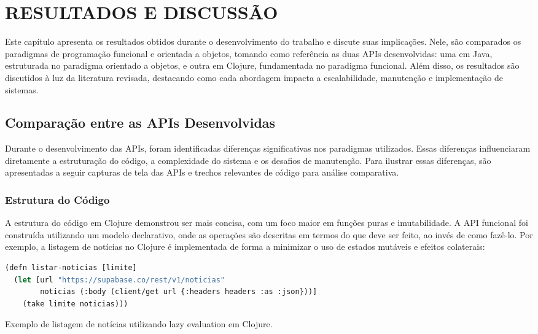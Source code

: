\chapter{RESULTADOS E DISCUSSÃO}

Este capítulo apresenta os resultados obtidos durante o desenvolvimento do trabalho e discute suas implicações. Nele, são comparados os paradigmas de programação funcional e orientada a objetos, tomando como referência as duas APIs desenvolvidas: uma em Java, estruturada no paradigma orientado a objetos, e outra em Clojure, fundamentada no paradigma funcional. Além disso, os resultados são discutidos à luz da literatura revisada, destacando como cada abordagem impacta a escalabilidade, manutenção e implementação de sistemas.

\section{Comparação entre as APIs Desenvolvidas}

Durante o desenvolvimento das APIs, foram identificadas diferenças significativas nos paradigmas utilizados. Essas diferenças influenciaram diretamente a estruturação do código, a complexidade do sistema e os desafios de manutenção. Para ilustrar essas diferenças, são apresentadas a seguir capturas de tela das APIs e trechos relevantes de código para análise comparativa.

\subsection{Estrutura do Código}

A estrutura do código em Clojure demonstrou ser mais concisa, com um foco maior em funções puras e imutabilidade. A API funcional foi construída utilizando um modelo declarativo, onde as operações são descritas em termos do que deve ser feito, ao invés de como fazê-lo. Por exemplo, a listagem de notícias no Clojure é implementada de forma a minimizar o uso de estados mutáveis e efeitos colaterais:

\begin{tcolorbox}[colback=gray!5!white, colframe=gray!75!black, title={Trecho de Código - Listagem de Notícias em Clojure}]
\begin{lstlisting}[language=Lisp]
(defn listar-noticias [limite]
  (let [url "https://supabase.co/rest/v1/noticias"
        noticias (:body (client/get url {:headers headers :as :json}))]
    (take limite noticias)))
\end{lstlisting}
\caption{Exemplo de listagem de notícias utilizando lazy evaluation em Clojure.}
\end{tcolorbox}

